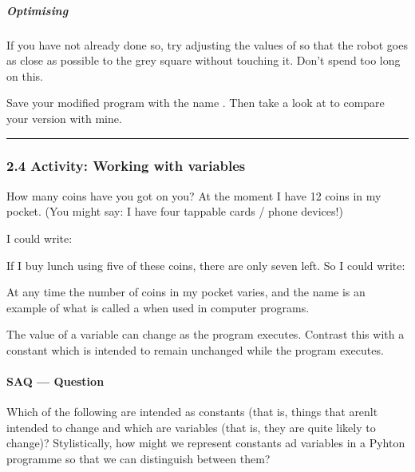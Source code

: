 \documentclass[letterpaper,10pt,english]{sphinxmanual}
\begin{document}
\subparagraph{Optimising}
\label{\detokenize{content/01_Robot_Lab/Section_00_02:Optimising}}
If you have not already done so, try adjusting the values of  so that the robot goes as close as possible to the grey square without touching it. Don’t spend too long on this.

Save your modified program with the name . Then take a look at  to compare your version with mine.


\bigskip\hrule\bigskip



\subsubsection{2.4 Activity: Working with variables}
\label{\detokenize{content/01_Robot_Lab/Section_00_02:2.4-Activity:-Working-with-variables}}
How many coins have you got on you? At the moment I have 12 coins in my pocket. (You might say: I have four tappable cards / phone devices!)

I could write:


If I buy lunch using five of these coins, there are only seven left. So I could write:


At any time the number of coins in my pocket varies, and the name  is an example of what is called a  when used in computer programs.

The value of a variable can change as the program executes. Contrast this with a constant which is intended to remain unchanged while the program executes.


\paragraph{SAQ — Question}
\label{\detokenize{content/01_Robot_Lab/Section_00_02:SAQ-_u2014-Question}}
Which of the following are intended as constants (that is, things that arenlt intended to change and which are variables (that is, they are quite likely to change)? Stylistically, how might we represent constants ad variables in a Pyhton programme so that we can distinguish between them?
\end{document}
